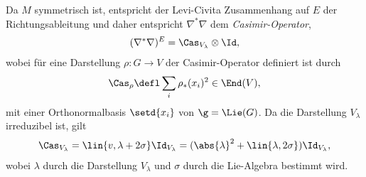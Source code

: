 \documentclass[%
	paper=a5,%
	fleqn,%
	DIV=18,%
	BCOR=0mm,
	fontsize=11pt,
	titlepage=false,%
	bibliography=totoc,
	DIV=18,%
	twoside=true,
	pdftitle=Riemannsche Geometrie,
	pdfauthor=Uwe Semmelmann,
	numbers=noendperiod]%
	{scrbook}
\begin{document}
Da $M$ symmetrisch ist, entspricht der Levi-Civita Zusammenhang auf $E$ der Richtungsableitung und daher entspricht $\nabla^*\nabla$ dem \textit{Casimir-Operator},
\begin{align*}
(\nabla^*\nabla)^E = \Cas_{V_{\lambda}}\otimes \Id,
\end{align*}
wobei für eine Darstellung $\rho\colon G\to V$ der Casimir-Operator definiert ist durch
\begin{align*}
\Cas_{\rho} \defl \sum_{i} \rho_{*}(x_{i})^2 \in \End(V),
\end{align*}
mit einer Orthonormalbasis $\setd{x_{i}}$  von $\g = \Lie(G)$. Da die Darstellung $V_{\lambda}$ irreduzibel ist, gilt
\begin{align*}
\Cas_{V_{\lambda}} = \lin{v,\lambda + 2\sigma}\Id_{V_{\lambda}}  =(\abs{\lambda}^2 + \lin{\lambda,2\sigma})\Id_{V_{\lambda}},
\end{align*}
wobei $\lambda$ durch die Darstellung $V_{\lambda}$ und $\sigma$ durch die Lie-Algebra bestimmt wird.
\end{document}
